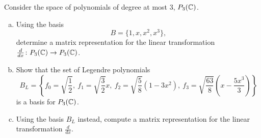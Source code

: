 \documentclass[12pt]{article} %
\begin{document}
\newpage
\begin{problem}
Consider the space of polynomials of degree at most 3, $P_3(\mathbb{C})$.
\begin{enumerate}[(a)]
    \item Using the basis
    \[
        B = \{ 1, x, x^2, x^3\},
    \]
    determine a matrix representation for the linear transformation $\frac{d}{dx} \colon P_3(\mathbb{C}) \to P_3(\mathbb{C})$.
    \item Show that the set of Legendre polynomials
    \[
        B_L = \left\{f_0 = \sqrt{\frac{1}{2}}, ~ f_1 = \sqrt{\frac{3}{2}}x, ~ f_2 = \sqrt{\frac{5}{8}} (1-3x^2),~ f_3=\sqrt{\frac{63}{8}}\left(x-\frac{5x^3}{3}\right) \right\}
    \]
    is a basis for $P_3(\mathbb{C})$.
    \item Using the basis $B_L$ instead, compute a matrix representation for the linear transformation $\frac{d}{dx}$.
\end{enumerate}
\end{problem}
\end{document}
